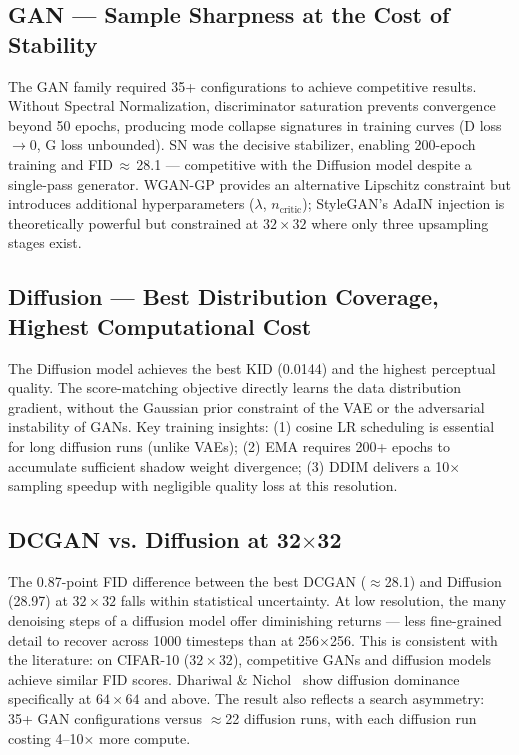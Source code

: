 \documentclass[runningheads]{llncs}
\begin{document}
\subsection{GAN — Sample Sharpness at the Cost of Stability}

The GAN family required 35+ configurations to achieve competitive results. Without Spectral Normalization, discriminator saturation prevents convergence beyond 50 epochs, producing mode collapse signatures in training curves (D loss $\to 0$, G loss unbounded). SN was the decisive stabilizer, enabling 200-epoch training and FID\,$\approx$\,28.1 — competitive with the Diffusion model despite a single-pass generator. WGAN-GP provides an alternative Lipschitz constraint but introduces additional hyperparameters ($\lambda$, $n_\text{critic}$); StyleGAN's AdaIN injection is theoretically powerful but constrained at $32{\times}32$ where only three upsampling stages exist.

\subsection{Diffusion — Best Distribution Coverage, Highest Computational Cost}

The Diffusion model achieves the best KID (0.0144) and the highest perceptual quality. The score-matching objective directly learns the data distribution gradient, without the Gaussian prior constraint of the VAE or the adversarial instability of GANs. Key training insights: (1) cosine LR scheduling is essential for long diffusion runs (unlike VAEs); (2) EMA requires 200+ epochs to accumulate sufficient shadow weight divergence; (3) DDIM delivers a 10$\times$ sampling speedup with negligible quality loss at this resolution.

\subsection{DCGAN vs. Diffusion at 32$\times$32}\label{sec:lowres}

The 0.87-point FID difference between the best DCGAN ($\approx$28.1) and Diffusion (28.97) at $32{\times}32$ falls within statistical uncertainty. At low resolution, the many denoising steps of a diffusion model offer diminishing returns — less fine-grained detail to recover across 1000 timesteps than at 256$\times$256. This is consistent with the literature: on CIFAR-10 ($32{\times}32$), competitive GANs and diffusion models achieve similar FID scores. Dhariwal \& Nichol~\cite{dhariwal2021} show diffusion dominance specifically at $64{\times}64$ and above. The result also reflects a search asymmetry: 35+ GAN configurations versus $\approx$22 diffusion runs, with each diffusion run costing 4--10$\times$ more compute.
\end{document}
